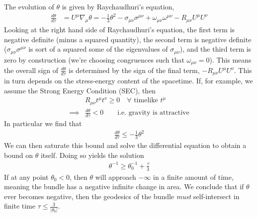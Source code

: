 \documentclass[10pt]{article}
\begin{document}
               		\par The evolution of $\theta$ is given by Raychaudhuri's equation,
               		\begin{align}
               		    \frac{d\theta}{d\tau} &= U^\mu\nabla_\mu\theta = -\frac{1}{3}\theta^2 - \sigma_{\mu\nu}\sigma^{\mu\nu} + \omega_{\mu\nu}\omega^{\mu\nu} - R_{\mu\nu}U^\mu U^\nu
               		\end{align}
               		Looking at the right hand side of Raychaudhuri's equation, the first term is negative definite (minus a squared quantity), the second term is negative definite ($\sigma_{\mu\nu}\sigma^{\mu\nu}$ is sort of a squared some of the eigenvalues of $\sigma_{\mu\nu}$), and the third term is zero by construction (we're choosing congruences such that $\omega_{\mu\nu} = 0$). This means the overall sign of $\frac{d\theta}{d\tau}$ is determined by the sign of the final term, $-R_{\mu\nu}U^\mu U^\nu$. This in turn depends on the stress-energy content of the spacetime. If, for example, we assume the Strong Energy Condition (SEC), then
               		\begin{align}
               		    &R_{\mu\nu}t^\mu t^\nu \geq 0\quad \forall\text{ timelike } t^\mu\\
               		    \implies& \frac{d\theta}{d\tau} < 0\qquad \text{i.e. gravity is attractive}
               		\end{align}
               		In particular we find that
               		\begin{align}
               		    \frac{d\theta}{d\tau} \leq -\frac{1}{3}\theta^2
               		\end{align}
               		We can then saturate this bound and solve the differential equation to obtain a bound on $\theta$ itself. Doing so yields the solution
               		\begin{align}
               		    \theta^{-1} \geq \theta_0^{-1} + \frac{\tau}{3}
               		\end{align}
               		If at any point $\theta_0 < 0$, then $\theta$ will approach $-\infty$ in a finite amount of time, meaning the bundle has a negative infinite change in area. We conclude that if $\theta$ ever becomes negative, then the geodesics of the bundle \textit{must} self-intersect in finite time $\tau \leq \frac{3}{|\theta_0|}$.
               		
\end{document}
